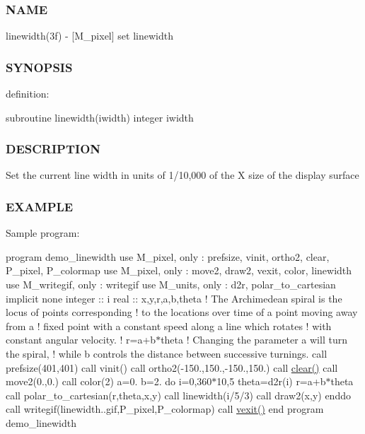 \subsubsection*{N\+A\+ME}

linewidth(3f) -\/ \mbox{[}M\+\_\+pixel\mbox{]} set linewidth 

\subsubsection*{S\+Y\+N\+O\+P\+S\+IS}

definition\+:

subroutine linewidth(iwidth) integer iwidth

\subsubsection*{D\+E\+S\+C\+R\+I\+P\+T\+I\+ON}

Set the current line width in units of 1/10,000 of the X size of the display surface \subsubsection*{E\+X\+A\+M\+P\+LE}

Sample program\+:

program demo\+\_\+linewidth use M\+\_\+pixel, only \+: prefsize, vinit, ortho2, clear, P\+\_\+pixel, P\+\_\+colormap use M\+\_\+pixel, only \+: move2, draw2, vexit, color, linewidth use M\+\_\+writegif, only \+: writegif use M\+\_\+units, only \+: d2r, polar\+\_\+to\+\_\+cartesian implicit none integer \+:\+: i real \+:\+: x,y,r,a,b,theta ! The Archimedean spiral is the locus of points corresponding ! to the locations over time of a point moving away from a ! fixed point with a constant speed along a line which rotates ! with constant angular velocity. ! r=a+b$\ast$theta ! Changing the parameter a will turn the spiral, ! while b controls the distance between successive turnings. call prefsize(401,401) call vinit(\textquotesingle{}\textquotesingle{}) call ortho2(-\/150.,150.,-\/150.,150.) call \hyperlink{namespacem__pixel_af3b81a21a0b2f6b5eddd09c031bd6173}{clear()} call move2(0.,0.) call color(2) a=0. b=2. do i=0,360$\ast$10,5 theta=d2r(i) r=a+b$\ast$theta call polar\+\_\+to\+\_\+cartesian(r,theta,x,y) call linewidth(i/5/3) call draw2(x,y) enddo call writegif(\textquotesingle{}linewidth..\+gif\textquotesingle{},P\+\_\+pixel,P\+\_\+colormap) call \hyperlink{namespacem__pixel_a19ad6b65752322b0029a62cc0ebec3e8}{vexit()} end program demo\+\_\+linewidth 

